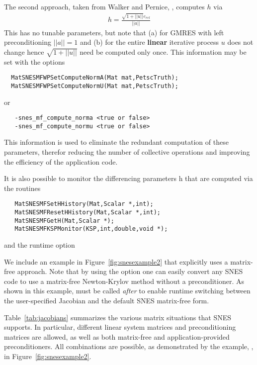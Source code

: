 The second approach, taken from Walker and Pernice, \cite{pw98}, computes $ h $ via
\begin{eqnarray*}
        h = \frac{\sqrt{1 + ||u||}e_{rel}}{||a||}
\end{eqnarray*}
This has no tunable parameters, but note that (a) for GMRES with left preconditioning
$ ||a|| = 1 $ and (b) for the entire {\bf linear} iterative process $ u $ does not change hence
$\sqrt{1 + ||u||} $ need be computed only once. This information may be set with the 
options
\begin{verbatim}
  MatSNESMFWPSetComputeNormA(Mat mat,PetscTruth);
  MatSNESMFWPSetComputeNormU(Mat mat,PetscTruth);
\end{verbatim}
or 
\begin{verbatim}
   -snes_mf_compute_norma <true or false>
   -snes_mf_compute_normu <true or false>
\end{verbatim}
This information is used to eliminate the redundant computation of these parameters,
therefor reducing the number of collective operations and improving the efficiency of the 
application code.

It is also possible to monitor the differencing parameters h that are computed
via the routines
\begin{verbatim}
   MatSNESMFSetHHistory(Mat,Scalar *,int);
   MatSNESMFResetHHistory(Mat,Scalar *,int);
   MatSNESMFGetH(Mat,Scalar *);
   MatSNESMFKSPMonitor(KSP,int,double,void *);
\end{verbatim}
and the runtime option   

We include an example in Figure~\ref{fig:snesexample2} that explicitly
uses a matrix-free approach.  Note that by using the option 
 one can easily convert any SNES code to use a matrix-free
Newton-Krylov method without a preconditioner.  As shown in this
example,  must be called {\em after}
 to enable runtime switching between the
user-specified Jacobian and the default SNES matrix-free form.

Table~\ref{tab:jacobians} summarizes the various matrix situations
that SNES supports.  In particular, different linear system matrices
and preconditioning matrices are allowed, as well as both matrix-free
and application-provided preconditioners.  All combinations are
possible, as demonstrated by the example, 
,
 in Figure~\ref{fig:snesexample2}.

